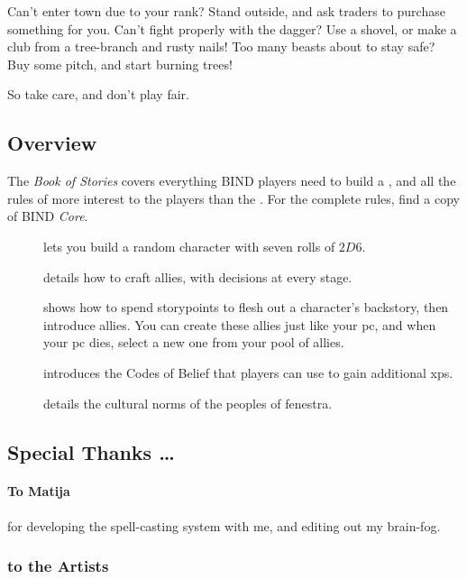 \begin{multicols}{2}
Can't enter town due to your rank?
Stand outside, and ask traders to purchase something for you.
Can't fight properly with the dagger?
Use a shovel, or make a club from a tree-branch and rusty nails!
Too many beasts about to stay safe?
Buy some pitch, and start burning trees!

So take care, and don't play fair.

\subsection*{Overview}

The \textit{Book of Stories} covers everything BIND players need to build a , and all the rules of more interest to the players than the .
For the complete rules, find a copy of BIND \textit{Core}.

\begin{description}
  \item[]
  lets you build a random character with seven rolls of $2D6$.
  \item[]
  details how to craft allies, with decisions at every stage.
  \item[] shows how to spend \glspl{storypoint} to flesh out a character's backstory, then introduce allies.
  You can create these allies just like your \gls{pc}, and when your \gls{pc} dies, select a new one from your pool of allies.
  \item[] introduces the Codes of Belief that players can use to gain additional \glspl{xp}.
  \item[] details the cultural norms of the peoples of \gls{fenestra}.
\end{description}

\subsection*{Special Thanks \ldots}

\paragraph{To Matija}
for developing the spell-casting system with me, and editing out my brain-fog.

\subsubsection*{to the Artists}


\end{multicols}
